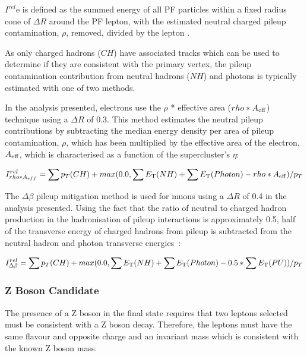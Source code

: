 $I^{rel}$e is defined as the summed energy of all PF particles within a fixed radius cone of $\Delta R$ around the PF lepton, with the estimated neutral charged pileup contamination, $\rho$, removed, divided by the lepton \pT.

As only charged hadrons ($CH$) have associated tracks which can be used to determine if they are consistent with the primary vertex, the pileup contamination contribution from neutral hadrons ($NH$) and photons is typically estimated with one of two methods.

In the analysis presented, electrons use the $\rho$ * effective area ($rho * A_{\rm eff}$) technique using a $\Delta R$ of 0.3.
This method estimates the neutral pileup contributions by subtracting the median energy density per area of pileup contamination, $\rho$, which has been multiplied by the effective area of the electron, $A_{\rm eff}$, which is characterised as a function of the supercluster's $\eta$:

\begin{equation}
I^{rel}_{rho * A_{eff}} = \sum p_T(CH) + max (0.0, \sum E_{\rm T}(NH) + \sum E_{\rm T}(Photon) -rho*A_{\rm eff} )/p_T \\
\end{equation}\label{eq:rhoEffA}

The $\Delta\beta$ pileup mitigation method is used for muons using a $\Delta R$ of 0.4 in the analysis presented.
Using the fact that the ratio of neutral to charged hadron production in the hadronisation of pileup interactions is approximately 0.5, half of the transverse energy of charged hadrons from pileup is subtracted from the neutral hadron and photon transverse energies~\cite{Chatrchyan:2012vp}:

\begin{equation}
I^{rel}_{\Delta\beta} = \sum p_T(CH) + max (0.0, \sum E_{\rm T}(NH) + \sum E_{\rm T}(Photon) - 0.5 * \sum E_{\rm T}(PU))/p_T \\
\end{equation}\label{eq:deltaBeta}

\subsubsection{Z Boson Candidate}
The presence of a Z boson in the final state requires that two leptons selected must be consistent with a Z boson decay.
Therefore, the leptons must have the same flavour and opposite charge and an invariant mass which is consistent with the known Z boson mass.

